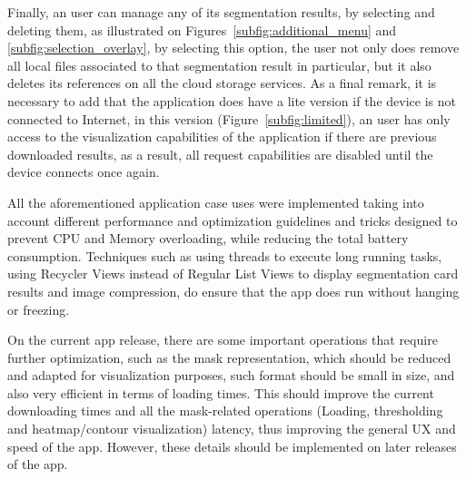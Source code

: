 Finally, an user can manage any of its segmentation results, by selecting and deleting them, as illustrated on Figures~\ref{subfig:additional_menu} and \ref{subfig:selection_overlay}, by selecting this option, the user not only does remove all local files associated to that segmentation result in particular, but it also deletes its references on all the cloud storage services. As a final remark, it is necessary to add that the application does have a lite version if the device is not connected to Internet, in this version (Figure~\ref{subfig:limited}), an user has only access to the visualization capabilities of the application if there are previous downloaded results, as a result, all request capabilities are disabled until the device connects once again.

All the aforementioned application case uses were implemented taking into account different performance and optimization guidelines and tricks designed to prevent CPU and Memory overloading, while reducing the total battery consumption. Techniques such as using threads to execute long running tasks, using Recycler Views instead of Regular List Views to display segmentation card results and image compression, do ensure that the app does run without hanging or freezing. 

On the current app release, there are some important operations that require further optimization, such as the mask representation, which should be reduced and adapted for visualization purposes, such format should be small in size, and also very efficient in terms of loading times. This should improve the current downloading times and all the mask-related operations (Loading, thresholding and heatmap/contour visualization) latency, thus improving the general UX and speed of the app. However, these details should be implemented on later releases of the app.

